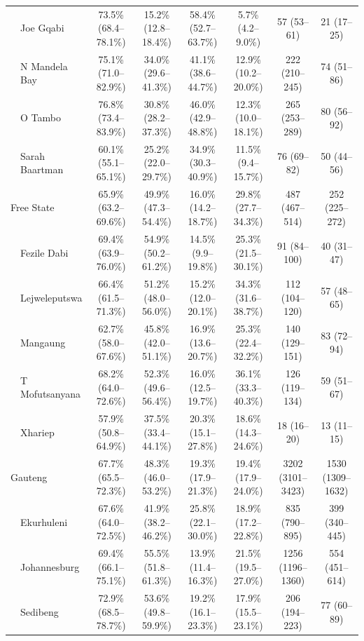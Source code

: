 \documentclass{article}
\begin{document}
\begin{landscape}
{\begin{longtable}[c]{llc cc ccc}
      & Joe Gqabi & 73.5\% (68.4--78.1\%) & 15.2\% (12.8--18.4\%) & 58.4\% (52.7--63.7\%) & 5.7\% (4.2--9.0\%) & 57 (53--61) & 21 (17--25) \\
      & N Mandela Bay & 75.1\% (71.0--82.9\%) & 34.0\% (29.6--41.3\%) & 41.1\% (38.6--44.7\%) & 12.9\% (10.2--20.0\%) & 222 (210--245) & 74 (51--86) \\
      & O Tambo & 76.8\% (73.4--83.9\%) & 30.8\% (28.2--37.3\%) & 46.0\% (42.9--48.8\%) & 12.3\% (10.0--18.1\%) & 265 (253--289) & 80 (56--92) \\
      & Sarah Baartman & 60.1\% (55.1--65.1\%) & 25.2\% (22.0--29.7\%) & 34.9\% (30.3--40.9\%) & 11.5\% (9.4--15.7\%) & 76 (69--82) & 50 (44--56) \\[5pt]
      \multicolumn{2}{l}{Free State}  & 65.9\% (63.2--69.6\%) & 49.9\% (47.3--54.4\%) & 16.0\% (14.2--18.7\%) & 29.8\% (27.7--34.3\%) & 487 (467--514) & 252 (225--272) \\
      & Fezile Dabi & 69.4\% (63.9--76.0\%) & 54.9\% (50.2--61.2\%) & 14.5\% (9.9--19.8\%) & 25.3\% (21.5--30.1\%) & 91 (84--100) & 40 (31--47) \\
      & Lejweleputswa & 66.4\% (61.5--71.3\%) & 51.2\% (48.0--56.0\%) & 15.2\% (12.0--20.1\%) & 34.3\% (31.6--38.7\%) & 112 (104--120) & 57 (48--65) \\
      & Mangaung & 62.7\% (58.0--67.6\%) & 45.8\% (42.0--51.1\%) & 16.9\% (13.6--20.7\%) & 25.3\% (22.4--32.2\%) & 140 (129--151) & 83 (72--94) \\
      & T Mofutsanyana & 68.2\% (64.0--72.6\%) & 52.3\% (49.6--56.4\%) & 16.0\% (12.5--19.7\%) & 36.1\% (33.3--40.3\%) & 126 (119--134) & 59 (51--67) \\
      & Xhariep & 57.9\% (50.8--64.9\%) & 37.5\% (33.4--44.1\%) & 20.3\% (15.1--27.8\%) & 18.6\% (14.3--24.6\%) & 18 (16--20) & 13 (11--15) \\[5pt]
      \multicolumn{2}{l}{Gauteng}  & 67.7\% (65.5--72.3\%) & 48.3\% (46.0--53.2\%) & 19.3\% (17.9--21.3\%) & 19.4\% (17.9--24.0\%) & 3202 (3101--3423) & 1530 (1309--1632) \\
      & Ekurhuleni & 67.6\% (64.0--72.5\%) & 41.9\% (38.2--46.2\%) & 25.8\% (22.1--30.0\%) & 18.9\% (17.2--22.8\%) & 835 (790--895) & 399 (340--445) \\
      & Johannesburg & 69.4\% (66.1--75.1\%) & 55.5\% (51.8--61.3\%) & 13.9\% (11.4--16.3\%) & 21.5\% (19.5--27.0\%) & 1256 (1196--1360) & 554 (451--614) \\
      & Sedibeng & 72.9\% (68.5--78.7\%) & 53.6\% (49.8--59.9\%) & 19.2\% (16.1--23.3\%) & 17.9\% (15.5--23.1\%) & 206 (194--223) & 77 (60--89) \\

\end{longtable}}
\end{landscape}
\end{document}
